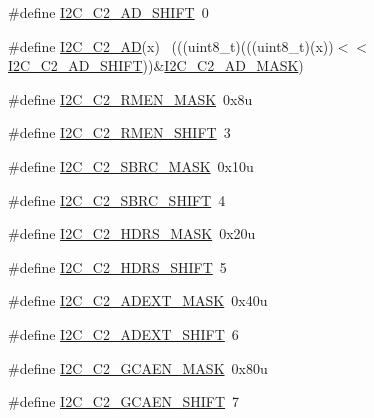 \begin{DoxyCompactItemize}
\item 
\#define \hyperlink{group___i2_c___register___masks_gab875d484e12dc6ae427c2063430d1362}{I2\+C\+\_\+\+C2\+\_\+\+A\+D\+\_\+\+S\+H\+I\+FT}~0
\item 
\#define \hyperlink{group___i2_c___register___masks_gad82ab5552b298f66f970ca92c4a2610e}{I2\+C\+\_\+\+C2\+\_\+\+AD}(x)                                                      ~(((uint8\+\_\+t)(((uint8\+\_\+t)(x))$<$$<$\hyperlink{group___i2_c___register___masks_gab875d484e12dc6ae427c2063430d1362}{I2\+C\+\_\+\+C2\+\_\+\+A\+D\+\_\+\+S\+H\+I\+FT}))\&\hyperlink{group___i2_c___register___masks_ga6c5f8db3bac4c51de9446448a8ad9072}{I2\+C\+\_\+\+C2\+\_\+\+A\+D\+\_\+\+M\+A\+SK})
\item 
\#define \hyperlink{group___i2_c___register___masks_ga70911373d5619a4d8376777446085856}{I2\+C\+\_\+\+C2\+\_\+\+R\+M\+E\+N\+\_\+\+M\+A\+SK}~0x8u
\item 
\#define \hyperlink{group___i2_c___register___masks_ga802a10e2d279895ec0230b4701b1a4bf}{I2\+C\+\_\+\+C2\+\_\+\+R\+M\+E\+N\+\_\+\+S\+H\+I\+FT}~3
\item 
\#define \hyperlink{group___i2_c___register___masks_gad5acb46182264a92f1f7ca818146d44e}{I2\+C\+\_\+\+C2\+\_\+\+S\+B\+R\+C\+\_\+\+M\+A\+SK}~0x10u
\item 
\#define \hyperlink{group___i2_c___register___masks_ga620079dc18e7ce504b6092503a10d2ae}{I2\+C\+\_\+\+C2\+\_\+\+S\+B\+R\+C\+\_\+\+S\+H\+I\+FT}~4
\item 
\#define \hyperlink{group___i2_c___register___masks_gaa36c867ead9ecee381f4a6f1f75ccc70}{I2\+C\+\_\+\+C2\+\_\+\+H\+D\+R\+S\+\_\+\+M\+A\+SK}~0x20u
\item 
\#define \hyperlink{group___i2_c___register___masks_ga0d2a8c7a7fb308cf052fc122c1af92c5}{I2\+C\+\_\+\+C2\+\_\+\+H\+D\+R\+S\+\_\+\+S\+H\+I\+FT}~5
\item 
\#define \hyperlink{group___i2_c___register___masks_ga331301810a6ac65f43e66b78bbde4c91}{I2\+C\+\_\+\+C2\+\_\+\+A\+D\+E\+X\+T\+\_\+\+M\+A\+SK}~0x40u
\item 
\#define \hyperlink{group___i2_c___register___masks_ga266bbd66a022e8b78eb5501d9d927164}{I2\+C\+\_\+\+C2\+\_\+\+A\+D\+E\+X\+T\+\_\+\+S\+H\+I\+FT}~6
\item 
\#define \hyperlink{group___i2_c___register___masks_gabe69d0985ed23c71c071a6ebd93f65df}{I2\+C\+\_\+\+C2\+\_\+\+G\+C\+A\+E\+N\+\_\+\+M\+A\+SK}~0x80u
\item 
\#define \hyperlink{group___i2_c___register___masks_ga2621c8acf26335441da9ced92ca4d29f}{I2\+C\+\_\+\+C2\+\_\+\+G\+C\+A\+E\+N\+\_\+\+S\+H\+I\+FT}~7
$$
\end{DoxyCompactItemize}

